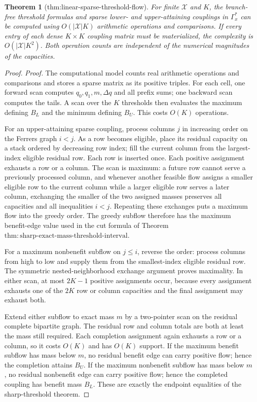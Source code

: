\documentclass{article}
\newtheorem{theorem}{Theorem}
\begin{document}
\begin{theorem}[thm:linear-sparse-threshold-flow]\label{thm:linear-sparse-threshold-flow}
For finite \(\mathcal X\) and \(K\), the branch-free threshold formulas and sparse lower- and upper-attaining couplings in \(\Gamma_x^{\ast}\) can be computed using \(O(|\mathcal X|K)\) arithmetic operations and comparisons.  If every entry of each dense \(K\times K\) coupling matrix must be materialized, the complexity is \(O(|\mathcal X|K^2)\).  Both operation counts are independent of the numerical magnitudes of the capacities.
\end{theorem}
\begin{proof}
\noindent\textit{Proof.}
The computational model counts real arithmetic operations and
comparisons and stores a sparse matrix as its positive triples.  For each
cell, one forward scan computes \(q_0,q_1,m,\Delta q\) and all prefix
sums; one backward scan computes the tails.  A scan over the \(K\)
thresholds then evaluates the maximum defining \(B_L\) and the minimum
defining \(B_U\).  This costs \(O(K)\) operations.

For an upper-attaining sparse coupling, process columns \(j\) in
increasing order on the Ferrers graph \(i<j\).  As a row becomes eligible,
place its residual capacity on a stack ordered by decreasing row index;
fill the current column from the largest-index eligible residual row.
Each row is inserted once.  Each positive assignment exhausts a row or a
column.  The scan is maximum: a future row cannot serve a previously
processed column, and whenever another feasible flow assigns a smaller
eligible row to the current column while a larger eligible row serves a
later column, exchanging the smaller of the two assigned masses preserves
all capacities and all inequalities \(i<j\).  Repeating these exchanges
puts a maximum flow into the greedy order.  The greedy subflow therefore
has the maximum benefit-edge value used in the cut formula of Theorem
\(\mathrm{thm{:}sharp\text{-}exact\text{-}mass\text{-}threshold\text{-}interval}\).

For a maximum nonbenefit subflow on \(j\le i\), reverse the order: process
columns from high to low and supply them from the smallest-index eligible
residual row.  The symmetric nested-neighborhood exchange argument proves
maximality.  In either scan, at most \(2K-1\) positive assignments occur,
because every assignment exhausts one of the \(2K\) row or column
capacities and the final assignment may exhaust both.

Extend either subflow to exact mass \(m\) by a two-pointer scan on the
residual complete bipartite graph.  The residual row and column totals are
both at least the mass still required.  Each completion assignment again
exhausts a row or a column, so it costs \(O(K)\) and has \(O(K)\) support.
If the maximum benefit subflow has mass below \(m\), no residual benefit
edge can carry positive flow; hence the completion attains \(B_U\).  If
the maximum nonbenefit subflow has mass below \(m\), no residual
nonbenefit edge can carry positive flow; hence the completed coupling has
benefit mass \(B_L\).  These are exactly the endpoint equalities of the
sharp-threshold theorem.


\end{proof}
\end{document}
